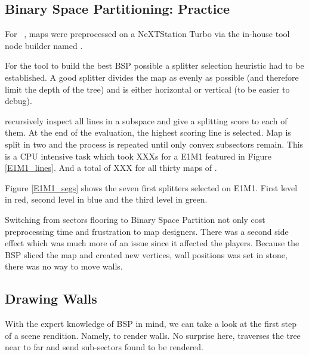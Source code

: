 \subsection{Binary Space Partitioning: Practice}
For \doom~, maps were preprocessed on a NeXTStation Turbo via the in-house tool node builder named .\\
\par
For the tool to build the best BSP possible a splitter selection heuristic had to be established. A good splitter divides the map as evenly as possible (and therefore limit the depth of the tree) and is either horizontal or vertical (to be easier to debug).\\
\par
  recursively inspect all lines in a subspace and give a splitting score to each of them. At the end of the evaluation, the highest scoring line is selected. Map is split in two and the process is repeated until only convex subsectors remain. This is a CPU intensive task which took XXXs for a E1M1 featured in Figure \ref{E1M1_lines}. And a total of XXX for all thirty maps of .\\
\par
{}
\par
Figure \ref{E1M1_segs} shows the seven first splitters selected on E1M1. First level in red, second level in blue and the third level in green.\\
\par
Switching from sectors flooring to Binary Space Partition not only cost preprocessing time and frustration to map designers. There was a second side effect which was much more of an issue since it affected the players. Because the BSP sliced the map and created new vertices, wall positions was set in stone, there was no way to move walls.


\par


\subsection{Drawing Walls}
With the expert knowledge of BSP in mind, we can take a look at the first step of a scene rendition. Namely, to render walls. No surprise here,  traverses the tree near to far and send sub-sectors found to be rendered.\\
\par
{}
\par


